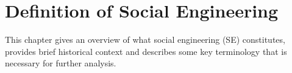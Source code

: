 

    

\chapter{Definition of Social Engineering\label{chapter:definition}}
\begin{comment}

Guides:
    - Page limit 1-2 pages
    - Context and terminology (käsitteet), challenges and measurement criteria, values, research question analysis
    - Second to last paragraph contains the research question (RQ) and the results

TODO:
    [ ] Who is this thesis for
    [ ] Why should you read my thesis
    [ ] What is the research question and how it is answered
    [ ] How is this thesis organized, what is covered and what is deliberaly not covered and in what chapters (outline)

What to cover:
    - What is cybersecurity and why it's of paramount importance
    - What is social engineering
        - Brief history of social engineering
            - Phishing in 1996 via AOL
    - Attacks, classical social engineering attacks
        - Phishing, vishing, smishing
        - Tailgating
        - Baiting (not always considered SE)
        - Dumpster diving (not always considered SE)
    - Countermeasures, classical
        - User awareness & training programs
        - Company policy & company culture
        - Real-time threat detection
        - Vulnerability detection
    - Typical challenges
    - Motives for cybercrimes
        - Hard(er) to detect?
        - "Easy" wins?

Literature:
    - Defining Social Engineering in Cybersecurity

\end{comment}


This chapter gives an overview of what social engineering (SE) constitutes, provides brief historical context and describes some key terminology that is necessary for further analysis. %


